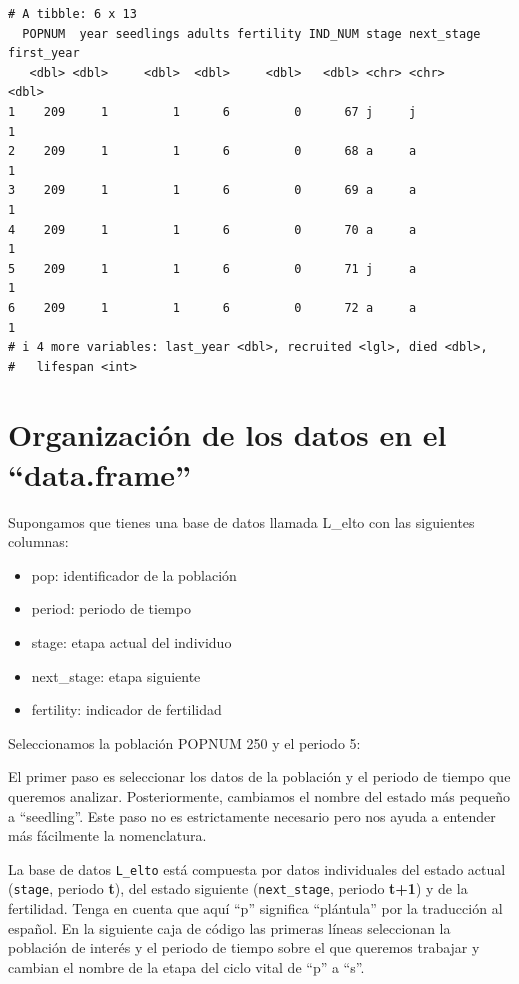 \documentclass[
  12pt,
  letterpaper,
]{book}
\providecommand{\tightlist}{%
  \setlength{\itemsep}{0pt}\setlength{\parskip}{0pt}}\usepackage{longtable,booktabs,array}
\begin{document}
\begin{verbatim}
# A tibble: 6 x 13
  POPNUM  year seedlings adults fertility IND_NUM stage next_stage first_year
   <dbl> <dbl>     <dbl>  <dbl>     <dbl>   <dbl> <chr> <chr>           <dbl>
1    209     1         1      6         0      67 j     j                   1
2    209     1         1      6         0      68 a     a                   1
3    209     1         1      6         0      69 a     a                   1
4    209     1         1      6         0      70 a     a                   1
5    209     1         1      6         0      71 j     a                   1
6    209     1         1      6         0      72 a     a                   1
# i 4 more variables: last_year <dbl>, recruited <lgl>, died <dbl>,
#   lifespan <int>
\end{verbatim}

\section{Organización de los datos en el
``data.frame''}\label{organizaciuxf3n-de-los-datos-en-el-data.frame}

Supongamos que tienes una base de datos llamada L\_elto con las
siguientes columnas:

\begin{itemize}
\tightlist
\item
  pop: identificador de la población
\item
  period: periodo de tiempo
\item
  stage: etapa actual del individuo
\item
  next\_stage: etapa siguiente
\item
  fertility: indicador de fertilidad
\end{itemize}

Seleccionamos la población POPNUM 250 y el periodo 5:

El primer paso es seleccionar los datos de la población y el periodo de
tiempo que queremos analizar. Posteriormente, cambiamos el nombre del
estado más pequeño a ``seedling''. Este paso no es estrictamente
necesario pero nos ayuda a entender más fácilmente la nomenclatura.

La base de datos \texttt{L\_elto} está compuesta por datos individuales
del estado actual (\texttt{stage}, periodo \textbf{t}), del estado
siguiente (\texttt{next\_stage}, periodo \textbf{t+1}) y de la
fertilidad. Tenga en cuenta que aquí ``p'' significa ``plántula'' por la
traducción al español. En la siguiente caja de código las primeras
líneas seleccionan la población de interés y el periodo de tiempo sobre
el que queremos trabajar y cambian el nombre de la etapa del ciclo vital
de ``p'' a ``s''.
\end{document}
